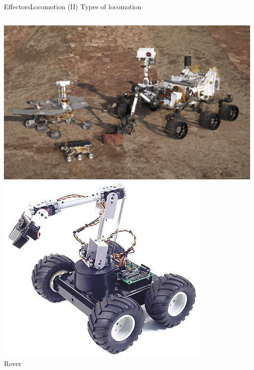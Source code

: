 \documentclass[10pt,compress]{beamer} %
\begin{document}
\begin{frame}{Effectors}{Locomotion (II)}
	\centering Types of locomotion
	\bigskip	
	\begin{columns}
		\centering \includegraphics[width=\linewidth]{figs/curiosity.jpeg}\\\bigskip
		\centering \includegraphics[width=\linewidth]{figs/rover.jpg}\\Rover

\end{columns}
\end{frame}
\end{document}
